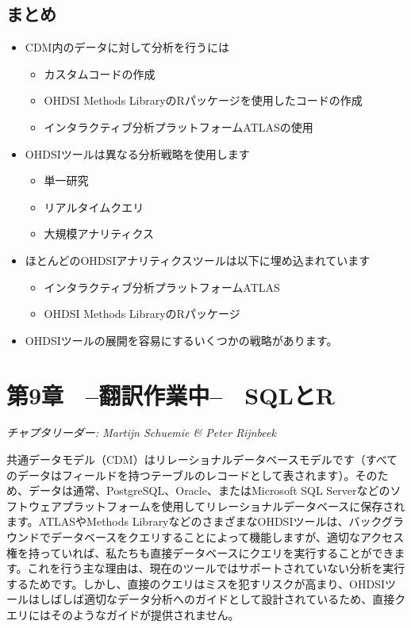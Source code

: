 \documentclass[
  11pt]{book}
\makeatletter
\providecommand{\tightlist}{%
  \setlength{\itemsep}{0pt}\setlength{\parskip}{0pt}}
\newenvironment{kframe}{%
\medskip{}
\setlength{\fboxsep}{.8em}
 \def\at@end@of@kframe{}%
 \ifinner\ifhmode%
  \def\at@end@of@kframe{\end{minipage}}%
  \begin{minipage}{\columnwidth}%
 \fi\fi%
 \def\FrameCommand##1{\hskip\@totalleftmargin \hskip-\fboxsep
 \colorbox{myShadeColor}{##1}\hskip-\fboxsep
     \hskip-\linewidth \hskip-\@totalleftmargin \hskip\columnwidth}%
 \MakeFramed {\advance\hsize-\width
   \@totalleftmargin\z@ \linewidth\hsize
   \@setminipage}}%
 {\par\unskip\endMakeFramed%
 \at@end@of@kframe}
\newenvironment{rmdblock}[1]
  {
  \begin{itemize}
  \renewcommand{\labelitemi}{
    \raisebox{-.7\height}[0pt][0pt]{
      {\setkeys{Gin}{width=3em,keepaspectratio}\texttt{[image: images/\#1]}}
    }
  }
  \setlength{\fboxsep}{1em}
  \begin{kframe}
  \item
  }
  {
  \end{kframe}
  \end{itemize}
  }
\newenvironment{rmdsummary}
  {\begin{rmdblock}{summary}}
  {\end{rmdblock}}
\theoremstyle{definition}
\theoremstyle{definition}
\theoremstyle{definition}
\theoremstyle{definition}
\theoremstyle{remark}
\makeatother
\begin{document}
\section{まとめ}\label{ux307eux3068ux3081-6}

\begin{rmdsummary}
\begin{itemize}
\tightlist
\item
  CDM内のデータに対して分析を行うには

  \begin{itemize}
  \tightlist
  \item
    カスタムコードの作成
  \item
    OHDSI Methods LibraryのRパッケージを使用したコードの作成
  \item
    インタラクティブ分析プラットフォームATLASの使用
  \end{itemize}
\item
  OHDSIツールは異なる分析戦略を使用します

  \begin{itemize}
  \tightlist
  \item
    単一研究
  \item
    リアルタイムクエリ
  \item
    大規模アナリティクス
  \end{itemize}
\item
  ほとんどのOHDSIアナリティクスツールは以下に埋め込まれています

  \begin{itemize}
  \tightlist
  \item
    インタラクティブ分析プラットフォームATLAS
  \item
    OHDSI Methods LibraryのRパッケージ
  \end{itemize}
\item
  OHDSIツールの展開を容易にするいくつかの戦略があります。
\end{itemize}
\end{rmdsummary}

\chapter{第9章　--翻訳作業中--　SQLとR}\label{SqlAndR}

\emph{チャプタリーダー: Martijn Schuemie \& Peter Rijnbeek}

共通データモデル（CDM）はリレーショナルデータベースモデルです（すべてのデータはフィールドを持つテーブルのレコードとして表されます）。そのため、データは通常、PostgreSQL、Oracle、またはMicrosoft SQL Serverなどのソフトウェアプラットフォームを使用してリレーショナルデータベースに保存されます。ATLASやMethods LibraryなどのさまざまなOHDSIツールは、バックグラウンドでデータベースをクエリすることによって機能しますが、適切なアクセス権を持っていれば、私たちも直接データベースにクエリを実行することができます。これを行う主な理由は、現在のツールではサポートされていない分析を実行するためです。しかし、直接のクエリはミスを犯すリスクが高まり、OHDSIツールはしばしば適切なデータ分析へのガイドとして設計されているため、直接クエリにはそのようなガイドが提供されません。
\end{document}
